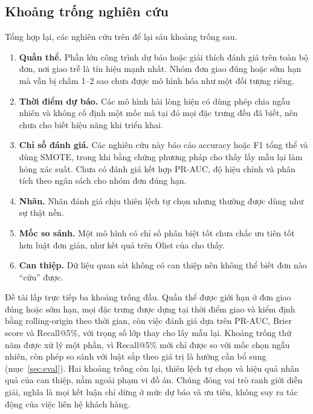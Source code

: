 \documentclass[12pt,a4paper]{report}
\begin{document}
\subsection{Khoảng trống nghiên cứu}\label{sec:rel-gaps}

Tổng hợp lại, các nghiên cứu trên để lại sáu khoảng trống sau.
\begin{enumerate}
  \item \textbf{Quần thể.} Phần lớn công trình dự báo hoặc giải thích đánh giá trên toàn bộ đơn, nơi giao trễ là tín hiệu mạnh nhất. Nhóm đơn giao đúng hoặc sớm hạn mà vẫn bị chấm 1--2 sao chưa được mô hình hóa như một đối tượng riêng.
  \item \textbf{Thời điểm dự báo.} Các mô hình hài lòng hiện có dùng phép chia ngẫu nhiên và không cố định một mốc mà tại đó mọi đặc trưng đều đã biết, nên chưa cho biết hiệu năng khi triển khai.
  \item \textbf{Chỉ số đánh giá.} Các nghiên cứu này báo cáo accuracy hoặc F1 tổng thể và dùng SMOTE, trong khi bằng chứng phương pháp cho thấy lấy mẫu lại làm hỏng xác suất. Chưa có đánh giá kết hợp PR-AUC, độ hiệu chỉnh và phân tích theo ngân sách cho nhóm đơn đúng hạn.
  \item \textbf{Nhãn.} Nhãn đánh giá chịu thiên lệch tự chọn nhưng thường được dùng như sự thật nền.
  \item \textbf{Mốc so sánh.} Một mô hình có chỉ số phân biệt tốt chưa chắc ưu tiên tốt hơn luật đơn giản, như kết quả trên Olist của \textcite{li2026valuesorting} cho thấy.
  \item \textbf{Can thiệp.} Dữ liệu quan sát không có can thiệp nên không thể biết đơn nào ``cứu'' được.
\end{enumerate}

Đề tài lấp trực tiếp ba khoảng trống đầu. Quần thể được giới hạn ở đơn giao đúng hoặc sớm hạn, mọi đặc trưng được dựng tại thời điểm giao và kiểm định bằng rolling-origin theo thời gian, còn việc đánh giá dựa trên PR-AUC, Brier score và Recall@5\%, với trọng số lớp thay cho lấy mẫu lại. Khoảng trống thứ năm được xử lý một phần, vì Recall@5\% mới chỉ được so với mốc chọn ngẫu nhiên, còn phép so sánh với luật sắp theo giá trị là hướng cần bổ sung (mục~\ref{sec:eval}). Hai khoảng trống còn lại, thiên lệch tự chọn và hiệu quả nhân quả của can thiệp, nằm ngoài phạm vi đồ án. Chúng đóng vai trò ranh giới diễn giải, nghĩa là mọi kết luận chỉ dừng ở mức dự báo và ưu tiên, không suy ra tác động của việc liên hệ khách hàng.

\end{document}
